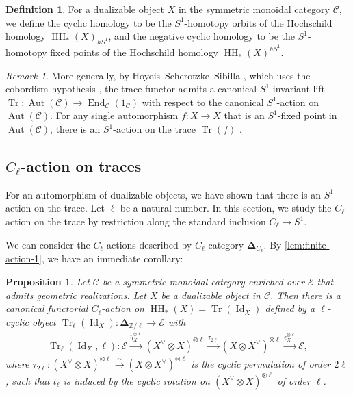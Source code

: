 \documentclass[11pt]{amsart}
\numberwithin{equation}{section}
\theoremstyle{plain}
\newtheorem{Prop}[prop]{Proposition}
\theoremstyle{definition}
\newtheorem{Def}[def]{Definition}
\theoremstyle{remark}
\newtheorem{RMK}[rmk]{Remark}
\newcommand{\bZ} { {\mathbb{Z}}}
\newcommand{\cC} { {\mathcal{C}}}
\newcommand{\cE} { {\mathcal{E}}}
\newcommand{\Id}{{\operatorname{Id}}}
\newcommand\End{\operatorname{End}}
\newcommand\HH{\operatorname{HH}}
\newcommand\Tr{\operatorname{Tr}}
\newcommand\Aut{\operatorname{Aut}}
\begin{document}
\begin{Def}
For a dualizable object $X$ in the symmetric monoidal category $\cC$, we define the cyclic homology to be the $S^1$-homotopy orbits of the Hochschild homology $\HH_*(X)_{hS^1}$, and the negative cyclic homology to be the $S^1$-homotopy fixed points of the Hochschild homology $\HH_*(X)^{hS^1}$.
\end{Def}

\begin{RMK}
More generally, by Hoyois--Scherotzke--Sibilla \cite[Proposition 2.16]{Hoyois-Scherotzke-Sibilla}, which uses the cobordism hypothesis \cite{Lurie-cobordism}, the trace functor admits a canonical $S^1$-invariant lift $\Tr: \Aut(\cC) \to \End_\cC(1_\cC)$ with respect to the canonical $S^1$-action on $\Aut(\cC)$. For any single automorphism $f: X \to X$ that is an $S^1$-fixed point in $\Aut(\cC)$, there is an $S^1$-action on the trace $\Tr(f)$ \cite[Proposition 4.3]{Brav-Dyckerhoff2}.
\end{RMK}


\subsection{\texorpdfstring{$C_\ell$-action on traces}{}}
For an automorphism of dualizable objects, we have shown that there is an $S^1$-action on the trace. Let $\ell$ be a natural number. In this section, we study the $C_\ell$-action on the trace by restriction along the standard inclusion $C_\ell \to S^1$.

We can consider the $C_\ell$-actions described by $C_\ell$-category $\boldsymbol{\Delta}_{C_\ell}$. By \autoref{lem:finite-action-1}, we have an immediate corollary:

\begin{Prop}\label{prop:inclusion-in-circle}
    Let $\cC$ be a symmetric monoidal category enriched over $\cE$ that admits geometric realizations. Let $X$ be a dualizable object in $\cC$. Then there is a canonical functorial $C_\ell$-action on $\HH_*(X) = \Tr(\Id_X)$ defined by a $\ell$-cyclic object $\Tr_\ell(\Id_X) : \boldsymbol{\Delta}_{\bZ/\ell} \to \cE$ with
    \begin{align*}
        \Tr_\ell(\Id_X, \ell): \cE \xrightarrow{\eta_X^{\otimes \ell}} (X^\vee \otimes X)^{\otimes \ell} \xrightarrow{\tau_{2\ell}} (X \otimes X^\vee)^{\otimes \ell} \xrightarrow{\epsilon_X^{\otimes \ell}} \cE,
    \end{align*}
    where $\tau_{2\ell}: (X^\vee \otimes X)^{\otimes \ell} \xrightarrow{\sim} (X \otimes X^\vee)^{\otimes \ell}$ is the cyclic permutation of order $2\ell$, such that $t_\ell$ is induced by the cyclic rotation on $(X^\vee \otimes X)^{\otimes \ell}$ of order $\ell$.
\end{Prop}
\end{document}
